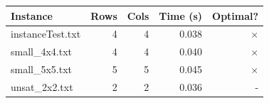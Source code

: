 \documentclass{article}
\begin{document}
\begin{center}
\begin{tabular}{lrrrr}
\toprule
\textbf{Instance} & \textbf{Rows} & \textbf{Cols} & \textbf{Time (s)} & \textbf{Optimal?} \\
\midrule
instanceTest.txt & 4 & 4 & 0.038 & $\times$ \\
small\_4x4.txt & 4 & 4 & 0.040 & $\times$ \\
small\_5x5.txt & 5 & 5 & 0.045 & $\times$ \\
unsat\_2x2.txt & 2 & 2 & 0.036 & - \\
\bottomrule
\end{tabular}
\end{center}
\end{document}
